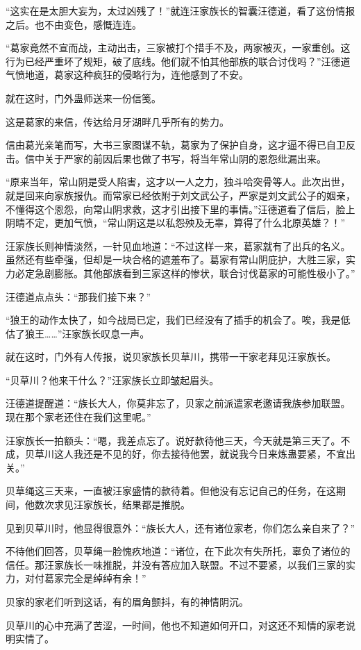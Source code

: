 \begin{this_body}
“这实在是太胆大妄为，太过凶残了！”就连汪家族长的智囊汪德道，看了这份情报之后。也不由变色，感慨连连。

“葛家竟然不宣而战，主动出击，三家被打个措手不及，两家被灭，一家重创。这行为已经严重坏了规矩，破了底线。他们就不怕其他部族的联合讨伐吗？”汪德道气愤地道，葛家这种疯狂的侵略行为，连他感到了不安。

就在这时，门外蛊师送来一份信笺。

这是葛家的来信，传达给月牙湖畔几乎所有的势力。

信由葛光亲笔而写，大书三家图谋不轨，葛家为了保护自身，这才逼不得已自卫反击。信中关于严家的前因后果也做了书写，将当年常山阴的恩怨纰漏出来。

“原来当年，常山阴是受人陷害，这才以一人之力，独斗哈突骨等人。此次出世，就是回来向家族报仇。而常家已经依附于刘文武公子，严家是刘文武公子的姻亲，不懂得这个恩怨，向常山阴求救，这才引出接下里的事情。”汪德道看了信后，脸上阴晴不定，更加气愤，“常山阴这是以私怨殃及无辜，算得了什么北原英雄？！”

汪家族长则神情淡然，一针见血地道：“不过这样一来，葛家就有了出兵的名义。虽然还有些牵强，但却是一块合格的遮羞布了。葛家有常山阴庇护，大胜三家，实力必定急剧膨胀。其他部族看到三家这样的惨状，联合讨伐葛家的可能性极小了。”

汪德道点点头：“那我们接下来？”

“狼王的动作太快了，如今战局已定，我们已经没有了插手的机会了。唉，我是低估了狼王……”汪家族长叹息一声。

就在这时，门外有人传报，说贝家族长贝草川，携带一干家老拜见汪家族长。

“贝草川？他来干什么？”汪家族长立即皱起眉头。

汪德道提醒道：“族长大人，你莫非忘了，贝家之前派遣家老邀请我族参加联盟。现在那个家老还住在我们这里呢。”

汪家族长一拍额头：“嗯，我差点忘了。说好款待他三天，今天就是第三天了。不成，贝草川这人我还是不见的好，你去接待他罢，就说我今日来炼蛊要紧，不宜出关。”

贝草绳这三天来，一直被汪家盛情的款待着。但他没有忘记自己的任务，在这期间，他数次求见汪家族长，结果都是推脱。

见到贝草川时，他显得很意外：“族长大人，还有诸位家老，你们怎么亲自来了？”

不待他们回答，贝草绳一脸愧疚地道：“诸位，在下此次有失所托，辜负了诸位的信任。那汪家族长一味推脱，并没有答应加入联盟。不过不要紧，以我们三家的实力，对付葛家完全是绰绰有余！”

贝家的家老们听到这话，有的眉角颤抖，有的神情阴沉。

贝草川的心中充满了苦涩，一时间，他也不知道如何开口，对这还不知情的家老说明实情了。

\end{this_body}

